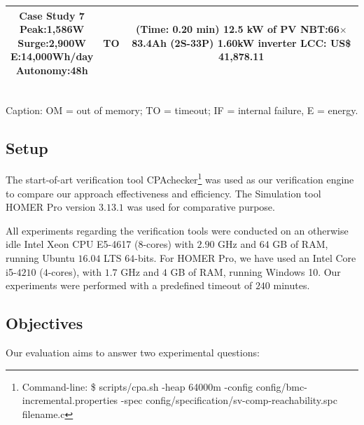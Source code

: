 \documentclass[journal]{IEEEtran}
\begin{document}
\begin{table}[!t]
\begin{scriptsize}
\begin{tabular}{|c|c|c|}
\hline
\makecell{\textbf{Case Study 7}\\Peak:1,586W\\Surge:2,900W\\E:14,000Wh/day\\Autonomy:48h} & TO & \makecell{(Time: 0.20 min)\\12.5 kW of PV\\NBT:66$\times$83.4Ah (2S-33P)\\1.60kW inverter\\LCC: US\$ 41,878.11} \\
\hline
\hline
\end{tabular}
\\Caption: OM = out of memory; TO = timeout; IF = internal failure, E = energy.
\end{scriptsize}
\end{table}

\subsection{Setup} 

The start-of-art verification tool CPAchecker\footnote{Command-line: \$ scripts/cpa.sh -heap 64000m -config config/bmc-incremental.properties -spec config/specification/sv-comp-reachability.spc filename.c} was used as our verification engine to compare our approach effectiveness and efficiency. The Simulation tool HOMER Pro version $3.13.1$ was used for comparative purpose.

All experiments regarding the verification tools were conducted 
on an otherwise idle Intel Xeon CPU E5-4617 ($8$-cores) with 
$2.90$ GHz and $64$ GB of RAM, running Ubuntu $16.04$ LTS $64$-bits. 
For HOMER Pro, we have used an Intel Core i5-$4210$ ($4$-cores), 
with $1.7$ GHz and $4$ GB of RAM, running Windows 10. 
Our experiments were performed with a predefined timeout of $240$ minutes.

\subsection{Objectives} 

Our evaluation aims to answer two experimental questions: 
\end{document}
